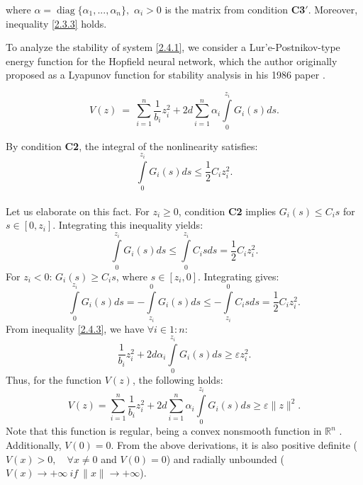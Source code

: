 \documentclass[journal]{IEEEtran}
\theoremstyle{myplain}
\begin{document}
\begin{IEEEproof}
where $\alpha = \operatorname{diag}\{\alpha_1,...,\alpha_n\},$ $\alpha_i>0$ is the matrix from condition \textbf{C3$'$}.
Moreover, inequality \eqref{2.3.3} holds.

To analyze the stability of system \eqref{2.4.1}, we consider a Lur'e-Postnikov-type energy function \cite{p17} for the Hopfield neural network, which the author originally proposed as a Lyapunov function for stability analysis in his 1986 paper \cite{p10}.

\begin{equation}\label{2.4.4}
V(z) ~= ~\sum\limits_{i=1}^n\frac {1}{b_i}z_i^2 +2d\sum\limits_{i=1}^n\alpha_i\int\limits_0^{z_i}G_i(s)ds.    
\end{equation}

By condition \textbf{C2}, the integral of the nonlinearity satisfies:
\[
\int\limits_0^{z_i}G_i(s)ds \leqslant\frac {1}{2} C_iz_i^2.
\]\\
Let us elaborate on this fact. For $z_i \geqslant 0 $, condition \textbf{C2} implies $G_i(s) \leqslant C_i s$ for $s\in [0,z_i]$. Integrating this inequality yields:
\[
\int\limits_0^{z_i} G_i (s) ds \leqslant\int\limits_0^{z_i}C_i sds = \frac{1}{2}C_iz_i^2.
\]
For $z_i < 0$: $G_i(s) \geqslant C_i s$, where $s\in [z_i,0]$. Integrating gives:
\[
\int\limits_0^{z_i}G_i(s)ds = - \int\limits_{z_i}^0G_i(s)ds \leqslant - \int\limits_{z_i}^0C_isds= \frac{1}{2}C_iz_i^2.
\]
From inequality \eqref{2.4.3}, we have $\forall i \in 1 : n$:
\[
\frac{1}{b_i}z_i^2+ 2 d \alpha_i \int\limits_0^{z_i} G_i(s)ds \geqslant \varepsilon z_i^2.
\]
Thus, for the function $V(z)$, the following holds:
\[
V(z) = \sum_{i=1}^n\frac{1}{b_i}z_i^2 + 2 d \sum_{i=1}^n\alpha_i \int\limits_0^{z_i}G_i(s)ds \geqslant \varepsilon \|z\|^2.
\]
Note that this function is regular, being a convex nonsmooth function in $\mathbb{R}^n$ \cite{516}. Additionally, $V(0)=0$. From the above derivations, it is also positive definite ($V(x)>0, \quad \forall x\ne 0$ and $V(0)=0$) and radially unbounded ($V(x)\to +\infty ~if ~\|x\| \to +\infty$).


\end{IEEEproof}
\end{document}
